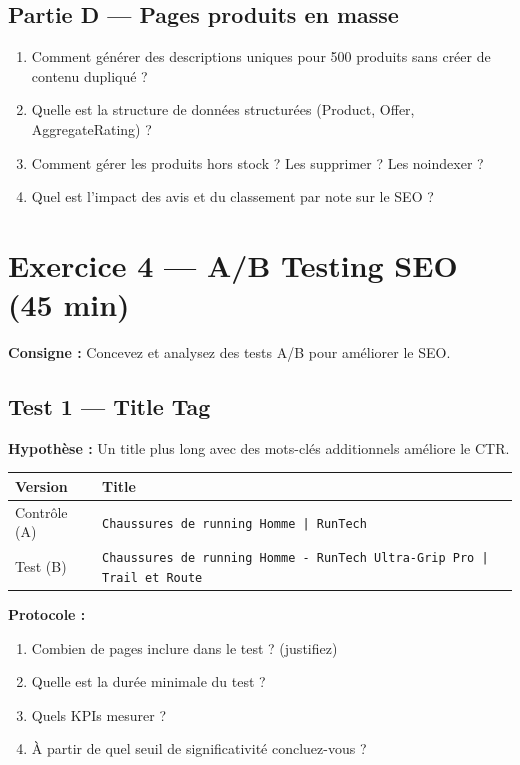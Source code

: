\documentclass[12pt,a4paper]{report}
\begin{document}
\subsection{Partie D --- Pages produits en masse}

\begin{enumerate}
\item Comment générer des descriptions uniques pour 500 produits sans créer de contenu dupliqué ?
\item Quelle est la structure de données structurées (Product, Offer, AggregateRating) ?
\item Comment gérer les produits hors stock ? Les supprimer ? Les noindexer ?
\item Quel est l'impact des avis et du classement par note sur le SEO ?
\end{enumerate}

\section{Exercice 4 --- A/B Testing SEO (45 min)}

\textbf{Consigne :} Concevez et analysez des tests A/B pour améliorer le SEO.

\subsection{Test 1 --- Title Tag}

\textbf{Hypothèse :} Un title plus long avec des mots-clés additionnels améliore le CTR.

\begin{longtable}{|l|l|}
\hline
\textbf{Version} & \textbf{Title} \\
\hline
Contrôle (A) & \texttt{Chaussures de running Homme | RunTech} \\
\hline
Test (B) & \texttt{Chaussures de running Homme - RunTech Ultra-Grip Pro | Trail et Route} \\
\hline
\end{longtable}

\textbf{Protocole :}
\begin{enumerate}
\item Combien de pages inclure dans le test ? (justifiez)
\item Quelle est la durée minimale du test ?
\item Quels KPIs mesurer ?
\item À partir de quel seuil de significativité concluez-vous ?
\end{enumerate}
\end{document}
